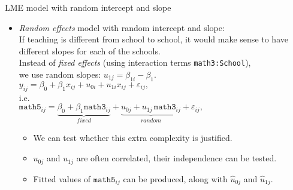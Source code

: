 \documentclass{beamer}
\begin{document}
\begin{frame}{LME model with random intercept and slope}
\begin{itemize}
\item \textit{Random effects} model with random intercept and slope:\\
\medskip
If teaching is different from school to school, it would make
sense to have different slopes for each of the schools.\\
\medskip
Instead of \textit{fixed effects} (using interaction terms \texttt{math3:School}), \\we use random slopes: $ u_{1j} = \beta_{1i} - \beta_1 $. \\
\medskip
$ y_{ij} = \beta_{0} + \beta_1 x_{ij} + u_{0i} + u_{1i} x_{ij}+ \varepsilon_{ij}, $ \\
\medskip
i.e.\\
\medskip
$\texttt{math5}_{ij} = \underbrace{\beta_{0} + \beta_1 \texttt{math3}_{ij}}_{\textit{fixed}}
+ \underbrace{u_{0j} + u_{1j}\, \texttt{math3}_{ij}}_{\textit{random}} 
+ \varepsilon_{ij}, $ \\
\medskip
\begin{itemize}
\item We can test whether this extra complexity is justified.
\smallskip
\item ${u}_{0j}$ and ${u}_{1j}$ are often correlated, their independence can be tested.
\smallskip
\item Fitted values of $\texttt{math5}_{ij}$ can be produced, along with $\hat{u}_{0j}$ and $\hat{u}_{1j}$.
\end{itemize}
\end{itemize}
\end{frame}
\end{document}
